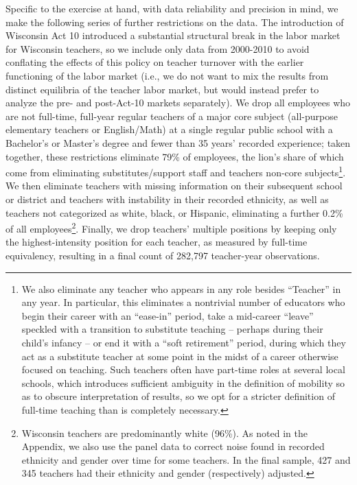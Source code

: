 Specific to the exercise at hand, with data reliability and precision in
mind, we make the following series of further restrictions on the data.
The introduction of Wisconsin Act 10 introduced a substantial structural
break in the labor market for Wisconsin teachers, so we include only
data from 2000-2010 to avoid conflating the effects of this policy on
teacher turnover with the earlier functioning of the labor market (i.e.,
we do not want to mix the results from distinct equilibria of the
teacher labor market, but would instead prefer to analyze the pre- and
post-Act-10 markets separately). We drop all employees who are not
full-time, full-year regular teachers of a major core subject
(all-purpose elementary teachers or English/Math) at a single regular
public school with a Bachelor's or Master's degree and fewer than 35
years' recorded experience; taken together, these restrictions eliminate
79\% of employees, the lion's share of which come from eliminating
substitutes/support staff and teachers non-core subjects\footnote{\label{ftn:pos_code}We
  also eliminate any teacher who appears in any role besides ``Teacher''
  in any year. In particular, this eliminates a nontrivial number of
  educators who begin their career with an ``ease-in'' period, take a
  mid-career ``leave'' speckled with a transition to substitute teaching
  -- perhaps during their child's infancy -- or end it with a ``soft
  retirement'' period, during which they act as a substitute teacher at
  some point in the midst of a career otherwise focused on teaching.
  Such teachers often have part-time roles at several local schools,
  which introduces sufficient ambiguity in the definition of mobility so
  as to obscure interpretation of results, so we opt for a stricter
  definition of full-time teaching than is completely necessary.}. We
then eliminate teachers with missing information on their subsequent
school or district and teachers with instability in their recorded
ethnicity, as well as teachers not categorized as white, black, or
Hispanic, eliminating a further 0.2\% of all employees\footnote{Wisconsin
  teachers are predominantly white (96\%). As noted in the Appendix, we
  also use the panel data to correct noise found in recorded ethnicity
  and gender over time for some teachers. In the final sample, 427 and
  345 teachers had their ethnicity and gender (respectively) adjusted.}.
Finally, we drop teachers' multiple positions by keeping only the
highest-intensity position for each teacher, as measured by full-time
equivalency, resulting in a final count of 282,797 teacher-year
observations.

